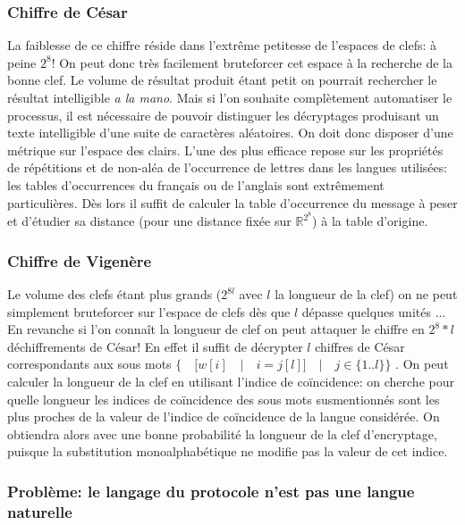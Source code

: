 \documentclass[11pt]{article} %
\begin{document}
\subsubsection{Chiffre de César}

    La faiblesse de ce chiffre réside dans l'extrême petitesse de l'espaces de clefs: à peine $2^8$! On peut donc très facilement bruteforcer cet espace à la recherche de la bonne clef. Le volume de résultat produit étant petit on pourrait rechercher le résultat intelligible \emph{a la mano}. Mais si l'on souhaite complètement automatiser le processus, il est nécessaire de pouvoir distinguer les décryptages produisant un texte intelligible d'une suite de caractères aléatoires. On doit donc disposer d'une métrique sur l'espace des clairs. L'une des plus efficace repose sur les propriétés de répétitions et de non-aléa de l'occurrence de lettres dans les langues utilisées: les tables d’occurrences du français ou de l'anglais sont extrêmement particulières. Dès lors il suffit de calculer la table d’occurrence du message à peser et d'étudier sa distance (pour une distance fixée sur $\mathbb{R}^{2^8}$) à la table d'origine.

\subsubsection{Chiffre de Vigenère}

    Le volume des clefs étant plus grands ($2^{8l}$ avec $l$ la longueur de la clef) on ne peut simplement bruteforcer sur l'espace de clefs dès que $l$ dépasse quelques unités ... En revanche si l'on connaît la longueur de clef on peut attaquer le chiffre en $2^8*l$ déchiffrements de César! En effet il suffit de décrypter $l$ chiffres de César correspondants aux sous mots 
$\{\quad [ w[i]\quad | \quad i = j [l] ] \quad | \quad j \in \{1..l\} \}$ . On peut calculer la longueur de la clef en utilisant l'indice de coïncidence: on cherche pour quelle longueur les indices de coïncidence des sous mots susmentionnés sont les plus proches de la valeur de l'indice de coïncidence de la langue considérée. On obtiendra alors avec une bonne probabilité la longueur de la clef d'encryptage, puisque la substitution monoalphabétique ne modifie pas la valeur de cet indice.

\subsubsection{Problème: le langage du protocole n'est pas une langue naturelle}
\end{document}
